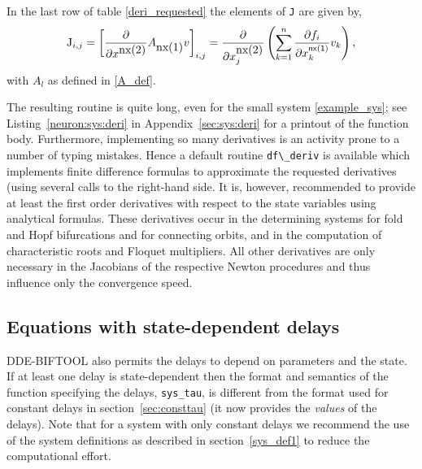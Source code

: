 \documentclass[10pt]{scrartcl}
\newcommand{\DDEBIFCODE}{\textsc{DDE-BIFTOOL}}
\newcommand{\parm}[1]{\mathsf{#1}}
\newcommand{\blist}[1]{\mbox{\lstinline!#1!}}
\begin{document}
In the last row of table \ref{deri_requested} the elements of \blist{J}
are given by,
\[
\blist{J}_{i,j}=\left[\frac{\partial}{\partial x^{\blist{nx(2)}}}
A_{\blist{nx(1)}}v\right]_{i,j}
=\frac{\partial}{\partial x_j^{\blist{nx(2)}}}
\left(\sum_{k=1}^n\frac{\partial f_i}{\partial x_k^{\parm{nx(1)}}} v_k
\right),
\]
with $A_l$ as defined in \eqref{A_def}.


The resulting routine is quite long, even for the small system
\eqref{example_sys}; see Listing~\ref{neuron:sys:deri} in
Appendix~\ref{sec:sys:deri} for a printout of the function body.  Furthermore,
implementing so many derivatives is an activity prone to a number of
typing mistakes. Hence a default routine \blist{df\_deriv} is
available which implements finite difference formulas to approximate
the requested derivatives (using several calls to the right-hand
side. It is, however, recommended to provide at least the first order
derivatives with respect to the state variables using analytical
formulas. These derivatives occur in the determining systems for fold
and Hopf bifurcations
and for connecting orbits,  
and in the computation of characteristic roots and Floquet multipliers.
All other derivatives are only necessary in the 
Jacobians of the respective Newton procedures and thus
influence only the convergence speed. 


\subsection{Equations with state-dependent
  delays}\label{sys_def2}
\DDEBIFCODE{} also permits the delays to depend on parameters and the
state. If at least one delay is state-dependent then the format and
semantics of the function specifying the delays, \blist{sys_tau}, is
different from the format used for constant delays in
section~\ref{sec:consttau} (it now provides the \emph{values} of the
delays).  Note that for a system with only constant delays we
recommend the use of the system definitions as described in
section~\ref{sys_def1} to reduce the computational effort.
\end{document}
